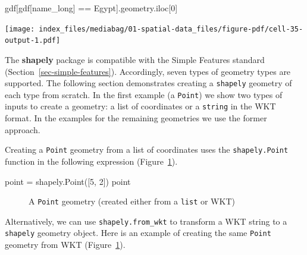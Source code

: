 \documentclass[
  letterpaper,
]{krantz}
\newenvironment{Shaded}{\begin{snugshade}}{\end{snugshade}}
\newcommand{\DecValTok}[1]{\textcolor[rgb]{0.68,0.00,0.00}{#1}}
\newcommand{\NormalTok}[1]{\textcolor[rgb]{0.00,0.23,0.31}{#1}}
\newcommand{\OperatorTok}[1]{\textcolor[rgb]{0.37,0.37,0.37}{#1}}
\newcommand{\StringTok}[1]{\textcolor[rgb]{0.13,0.47,0.30}{#1}}
\begin{document}
\begin{Shaded}
\begin{Highlighting}[]
\NormalTok{gdf[gdf[}\StringTok{\textquotesingle{}name\_long\textquotesingle{}}\NormalTok{] }\OperatorTok{==} \StringTok{\textquotesingle{}Egypt\textquotesingle{}}\NormalTok{].geometry.iloc[}\DecValTok{0}\NormalTok{]}
\end{Highlighting}
\end{Shaded}

\texttt{[image: index\_files/mediabag/01-spatial-data\_files/figure-pdf/cell-35-output-1.pdf]}

The \textbf{shapely} package is compatible with the Simple Features
standard (Section~\ref{sec-simple-features}). Accordingly, seven types
of geometry types are supported. The following section demonstrates
creating a \texttt{shapely} geometry of each type from scratch. In the
first example (a \texttt{\textquotesingle{}Point\textquotesingle{}}) we
show two types of inputs to create a geometry: a list of coordinates or
a \texttt{string} in the WKT format. In the examples for the remaining
geometries we use the former approach.

Creating a \texttt{\textquotesingle{}Point\textquotesingle{}} geometry
from a list of coordinates uses the \texttt{shapely.Point} function in
the following expression (Figure~\ref{fig-point}).

\begin{Shaded}
\begin{Highlighting}[]
\NormalTok{point }\OperatorTok{=}\NormalTok{ shapely.Point([}\DecValTok{5}\NormalTok{, }\DecValTok{2}\NormalTok{])}
\NormalTok{point}
\end{Highlighting}
\end{Shaded}

\begin{figure}[H]


\caption{\label{fig-point}A \texttt{Point} geometry (created either from
a \texttt{list} or WKT)}

\end{figure}%

Alternatively, we can use \texttt{shapely.from\_wkt} to transform a WKT
string to a \texttt{shapely} geometry object. Here is an example of
creating the same \texttt{\textquotesingle{}Point\textquotesingle{}}
geometry from WKT (Figure~\ref{fig-point}).
\end{document}

